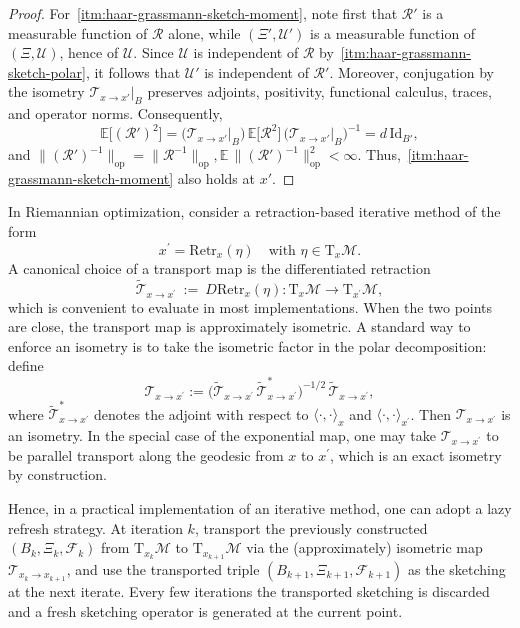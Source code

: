 \documentclass[final,onefignum,onetabnum]{siamart250211}
\begin{document}
\begin{proof}
For~\ref{itm:haar-grassmann-sketch-moment}, note first that $\mathcal R'$ is a measurable function of $\mathcal R$ alone, while $(\Xi',\mathcal U')$ is a measurable function of $(\Xi,\mathcal U)$, hence of $\mathcal U$.
Since $\mathcal U$ is independent of $\mathcal R$ by~\ref{itm:haar-grassmann-sketch-polar}, it follows that $\mathcal U'$ is independent of $\mathcal R'$.
Moreover, conjugation by the isometry $\mathcal T_{x\to x'}\vert_B$ preserves adjoints, positivity, functional calculus, traces, and operator norms.
Consequently,
\[
\mathbb E\big[(\mathcal R')^{2}\big]
=\bigl(\mathcal T_{x\to x'}\vert_B\bigr)
\,\mathbb E\big[\mathcal R^{2}\big]\,
\bigl(\mathcal T_{x\to x'}\vert_B\bigr)^{-1}
=d\,\mathrm{Id}_{B'},
\]
and
$
\| (\mathcal R')^{-1}\|_{\mathrm{op}}=\|\mathcal R^{-1}\|_{\mathrm{op}},
\mathbb E\,\|(\mathcal R')^{-1}\|_{\mathrm{op}}^{2}<\infty.
$
Thus,~\ref{itm:haar-grassmann-sketch-moment} also holds at $x'$.
\end{proof}

\begin{remark}
In Riemannian optimization,
consider a retraction-based iterative method of the form
\[
  x^{\prime}=\mathrm{Retr}_x(\eta) \quad \text{with } \eta\in \mathrm T_x\mathcal M.
\]
A canonical choice of a transport map is the differentiated retraction
\[
  \widetilde{\mathcal T}_{x\to x^{\prime}}\ :=\ D\mathrm{Retr}_x(\eta):\mathrm T_x\mathcal M\to \mathrm T_{x^{\prime}}\mathcal M,
\]
which is convenient to evaluate in most implementations. When the two points are close, the transport map is approximately isometric.
A standard way to enforce an isometry is to take the isometric factor in the polar decomposition: define
\[
  \mathcal T_{x\to x^{\prime}}
  :=\bigl(\widetilde{\mathcal T}_{x\to x^{\prime}}\,\widetilde{\mathcal T}_{x\to x^{\prime}}^{*}\bigr)^{-1/2}\,\widetilde{\mathcal T}_{x\to x^{\prime}},
\]
where \(\widetilde{\mathcal T}_{x\to x^{\prime}}^{*}\) denotes the adjoint with respect to \(\langle\cdot,\cdot\rangle_x\) and \(\langle\cdot,\cdot\rangle_{x^{\prime}}\).
Then \(\mathcal T_{x\to x^{\prime}}\) is an isometry.
In the special case of the exponential map, one may take \(\mathcal T_{x\to x^{\prime}}\) to be parallel transport along the geodesic from \(x\) to \(x^{\prime}\), which is an exact isometry by construction.

Hence, in a practical implementation of an iterative method, one can adopt a lazy refresh strategy. At iteration \(k\), transport the previously constructed \((B_k,\Xi_k,\mathcal F_k)\) from \(\mathrm T_{x_k}\mathcal M\) to \(\mathrm T_{x_{k+1}}\mathcal M\) via the (approximately) isometric map \(\mathcal T_{x_k\to x_{k+1}}\), and use the transported triple \((B_{k+1},\Xi_{k+1},\mathcal F_{k+1})\) as the sketching at the next iterate.
Every few iterations the transported sketching is discarded and a fresh sketching operator is generated at the current point.
\end{remark}
\end{document}
